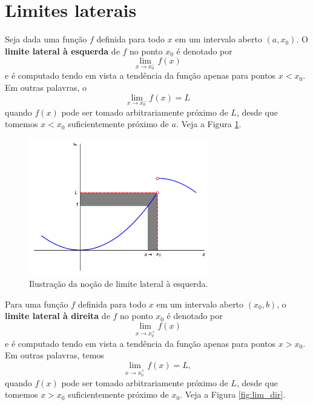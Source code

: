 \section{Limites laterais}\label{cap_lim_sec_lateral}

Seja dada uma função $f$ definida para todo $x$ em um intervalo aberto $(a, x_0)$. O {\bf limite lateral à esquerda} de $f$ no ponto $x_0$ é denotado por
\begin{equation}
  \lim_{x\to x_0^-} f(x)
\end{equation}
e é computado tendo em vista a tendência da função apenas para pontos $x<x_0$. Em outras palavras, o
\begin{equation}
  \lim_{x\to x_0^-} f(x) = L
\end{equation}
quando $f(x)$ pode ser tomado arbitrariamente próximo de $L$, desde que tomemos $x<x_0$ suficientemente próximo de $a$. Veja a Figura \ref{fig:lim_esq}.

\begin{figure}[H]
  \centering
  \includegraphics[width=0.7\textwidth]{./cap_lim/dados/fig_lim_esq/fig_lim_esq}
  \caption{Ilustração da noção de limite lateral à esquerda.}
  \label{fig:lim_esq}
\end{figure}

Para uma função $f$ definida para todo $x$ em um intervalo aberto $(x_0, b)$, o {\bf limite lateral à direita} de $f$ no ponto $x_0$ é denotado por
\begin{equation}
  \lim_{x\to x_0^+} f(x)
\end{equation}
e é computado tendo em vista a tendência da função apenas para pontos $x>x_0$. Em outras palavras, temos
\begin{equation}
  \lim_{x\to x_0^+} f(x) = L,
\end{equation}
quando $f(x)$ pode ser tomado arbitrariamente próximo de $L$, desde que tomemos $x>x_0$ suficientemente próximo de $x_0$. Veja a Figura \ref{fig:lim_dir}.

